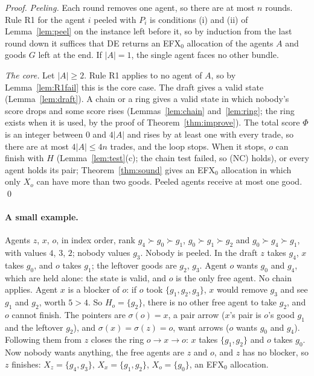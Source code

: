 \documentclass[runningheads,11pt]{llncs}
\newcommand{\efxz}{\texorpdfstring{\mbox{EFX$_0$}}{EFX0}}
\newcommand{\DE}{\textup{DE}}
\begin{document}
\begin{proof}
\emph{Peeling.} Each round removes one agent, so there are at most $n$ rounds. Rule R1 for the agent $i$ peeled with $P_i$ is conditions (i) and (ii) of Lemma~\ref{lem:peel} on the instance left before it, so by induction from the last round down it suffices that \DE{} returns an \efxz{} allocation of the agents $A$ and goods $G$ left at the end. If $|A|=1$, the single agent faces no other bundle.

\emph{The core.} Let $|A|\ge2$. Rule R1 applies to no agent of $A$, so by Lemma~\ref{lem:R1fail} this is the core case. The draft gives a valid state (Lemma~\ref{lem:draft}). A chain or a ring gives a valid state in which nobody's score drops and some score rises (Lemmas~\ref{lem:chain} and~\ref{lem:ring}; the ring exists when it is used, by the proof of Theorem~\ref{thm:improve}). The total score $\Phi$ is an integer between $0$ and $4|A|$ and rises by at least one with every trade, so there are at most $4|A|\le4n$ trades, and the loop stops. When it stops, $o$ can finish with $H$ (Lemma~\ref{lem:test}(c); the chain test failed, so (NC) holds), or every agent holds its pair; Theorem~\ref{thm:sound} gives an \efxz{} allocation in which only $X_o$ can have more than two goods. Peeled agents receive at most one good. \qed
\end{proof}

\paragraph{A small example.} Agents $z$, $x$, $o$, in index order, rank $g_4\succ g_0\succ g_1$, $g_0\succ g_1\succ g_2$ and $g_0\succ g_4\succ g_1$, with values $4$, $3$, $2$; nobody values $g_3$. Nobody is peeled. In the draft $z$ takes $g_4$, $x$ takes $g_0$, and $o$ takes $g_1$; the leftover goods are $g_2$, $g_3$. Agent $o$ wants $g_0$ and $g_4$, which are held alone: the state is valid, and $o$ is the only free agent. No chain applies. Agent $x$ is a blocker of $o$: if $o$ took $\{g_1,g_2,g_3\}$, $x$ would remove $g_3$ and see $g_1$ and $g_2$, worth $5>4$. So $H_o=\{g_2\}$, there is no other free agent to take $g_2$, and $o$ cannot finish. The pointers are $\sigma(o)=x$, a pair arrow ($x$'s pair is $o$'s good $g_1$ and the leftover $g_2$), and $\sigma(x)=\sigma(z)=o$, want arrows ($o$ wants $g_0$ and $g_4$). Following them from $z$ closes the ring $o\to x\to o$: $x$ takes $\{g_1,g_2\}$ and $o$ takes $g_0$. Now nobody wants anything, the free agents are $z$ and $o$, and $z$ has no blocker, so $z$ finishes: $X_z=\{g_4,g_3\}$, $X_x=\{g_1,g_2\}$, $X_o=\{g_0\}$, an \efxz{} allocation.
\end{document}
